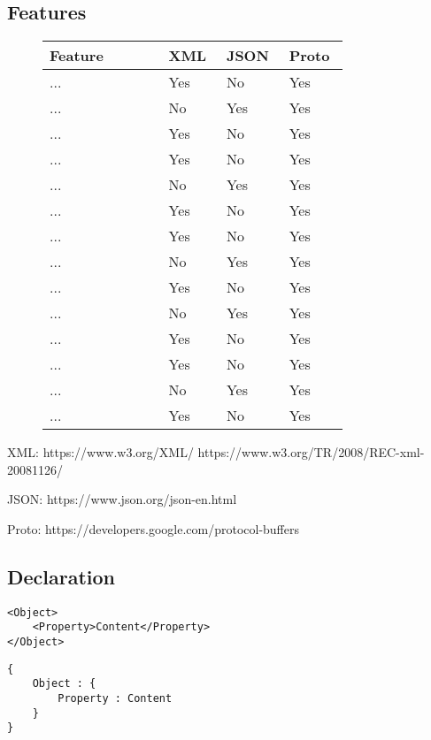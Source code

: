 \documentclass[../report.tex]{subfiles}
\begin{document}
\subsection{Features}

\begin{figure}[H]
\def\arraystretch{1.5}
\begin{tabular}{|p{0.35\linewidth}|p{0.15\linewidth}|p{0.15\linewidth}|p{0.15\linewidth}|}
\hline
Feature & XML & JSON & Proto \\
\hline
... & Yes & No & Yes \\ 
... & No & Yes & Yes \\ 
... & Yes & No & Yes \\ 
... & Yes & No & Yes \\ 
... & No & Yes & Yes \\ 
... & Yes & No & Yes \\ 
... & Yes & No & Yes \\ 
... & No & Yes & Yes \\ 
... & Yes & No & Yes \\ 
... & No & Yes & Yes \\ 
... & Yes & No & Yes \\ 
... & Yes & No & Yes \\ 
... & No & Yes & Yes \\ 
... & Yes & No & Yes \\ 
\hline
\end{tabular}
\end{figure}

XML: https://www.w3.org/XML/ https://www.w3.org/TR/2008/REC-xml-20081126/

JSON: https://www.json.org/json-en.html

Proto: https://developers.google.com/protocol-buffers

\subsection{Declaration}

\begin{Verbatim}[frame=single,numbers=right,framesep=5mm,label=XML Object]
<Object>
    <Property>Content</Property>
</Object>
\end{Verbatim}

\vspace{1mm}

\begin{Verbatim}[frame=single,numbers=right,framesep=5mm,label=JSON Object]
{
    Object : {
        Property : Content
    }
}
\end{Verbatim}
\end{document}
